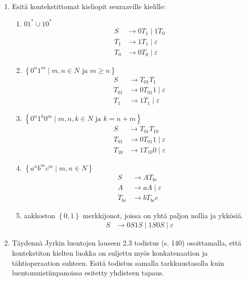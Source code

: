 \documentclass[a4paper,11pt]{article}
\newcommand{\set}[1]{{\left\{ #1 \right\}}}
\begin{document}
\begin{enumerate}
\item
Esitä kontekstittomat  kieliopit seuraaville kielille:
\begin{enumerate}
\item $01^\ast\cup10^\ast$
  \begin{align*}
    S   & \to 0T_1 \mid 1T_0 \\
    T_1 & \to 1T_1 \mid \varepsilon \\
    T_0 & \to 0T_0 \mid \varepsilon
  \end{align*}
\item $\set{0^n1^m\mid\mbox{$m,n\in N$ ja $m\geq n$}}$
  \begin{align*}
    S      & \to T_{01} T_1 \\
    T_{01} & \to 0T_{01}1 \mid \varepsilon \\
    T_{1}  & \to 1T_1 \mid \varepsilon
  \end{align*}
\item $\set{0^n1^k0^m\mid\mbox{$m,n,k\in N$ ja $k=n+m$}}$
  \begin{align*}
    S & \to T_{01} T_{10} \\
    T_{01} & \to 0T_{01}1 \mid \varepsilon \\
    T_{10} & \to 1T_{10}0 \mid \varepsilon
  \end{align*}
\item $\set{a^n b^m c^m\mid m,n\in N}$
  \begin{align*}
    S & \to AT_{bc} \\
    A & \to aA \mid \varepsilon \\
    T_{bc} & \to bT_{bc}c
  \end{align*}
\item
  aakkoston $\set{0,1}$ merkkijonot, joissa on yhtä paljon nollia ja
  ykkösiä.
  \begin{align*}
    S & \to 0S1S \mid 1S0S \mid \varepsilon
  \end{align*}
\end{enumerate}

\item
  Täydennä Jyrkin luentojen lauseen 2.3 todistus (s. 140)
  osoittamalla, että kontekstiton kielten luokka on suljettu myös
  konkatenaation ja tähtioperaation suhteen. Esitä todistus samalla
  tarkkuustasolla kuin luentomuistiinpanoissa esitetty yhdisteen
  tapaus.
  

\end{enumerate}
\end{document}
